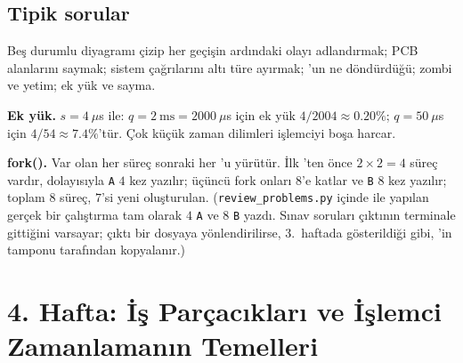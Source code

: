 \subsection*{Tipik sorular}
Beş durumlu diyagramı çizip her geçişin ardındaki olayı adlandırmak; PCB alanlarını saymak; sistem çağrılarını altı türe ayırmak; 'un ne döndürdüğü; zombi ve yetim; ek yük ve  sayma.

\begin{example}
\textbf{Ek yük.} $s = 4\ \mu$s ile: $q = 2\ \text{ms} = 2000\ \mu$s için ek yük $4/2004 \approx 0.20\%$; $q = 50\ \mu$s için $4/54 \approx 7.4\%$'tür. Çok küçük zaman dilimleri işlemciyi boşa harcar.

\textbf{fork().}  Var olan her süreç sonraki her 'u yürütür. İlk 'ten önce $2 \times 2 = 4$ süreç vardır, dolayısıyla \texttt{A} $4$ kez yazılır; üçüncü fork onları $8$'e katlar ve \texttt{B} $8$ kez yazılır; toplam $8$ süreç, $7$'si yeni oluşturulan. (\texttt{review\_problems.py} içinde  ile yapılan gerçek bir çalıştırma tam olarak $4$ \texttt{A} ve $8$ \texttt{B} yazdı. Sınav soruları çıktının terminale gittiğini varsayar; çıktı bir dosyaya yönlendirilirse, 3.~haftada gösterildiği gibi, 'in tamponu  tarafından kopyalanır.)
\end{example}

\section{4. Hafta: İş Parçacıkları ve İşlemci Zamanlamanın Temelleri}
\label{sec:w4}
